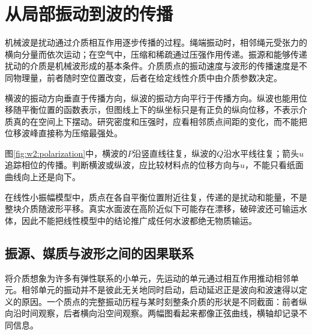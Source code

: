 \section{从局部振动到波的传播}
机械波是扰动通过介质相互作用逐步传播的过程。绳端振动时，相邻绳元受张力的横向分量而依次运动；在空气中，压缩和稀疏通过压强作用传递。振源和能够传递扰动的介质是机械波形成的基本条件。介质质点的振动速度与波形的传播速度是不同物理量，前者随时空位置改变，后者在给定线性介质中由介质参数决定。

横波的振动方向垂直于传播方向，纵波的振动方向平行于传播方向。纵波也能用位移随平衡位置的函数表示，但图线上下的纵坐标只是有正负的纵向位移，不表示介质真的在空间上下摆动。研究密度和压强时，应看相邻质点间距的变化，而不能把位移波峰直接称为压缩最强处。

图\ref{fig:w2:polarization}中，横波的$P$沿竖直线往复，纵波的$Q$沿水平线往复；箭头$u$追踪相位的传播。判断横波或纵波，应比较材料点的位移方向与$u$，不能只看纸面曲线向上还是向下。


在线性小振幅模型中，质点在各自平衡位置附近往复，传递的是扰动和能量，不是整块介质随波形平移。真实水面波在高阶近似下可能存在漂移，破碎波还可输运水体，因此不能把线性模型中的结论推广成任何水波都绝无物质输运。


\subsection{振源、媒质与波形之间的因果联系}
将介质想象为许多有弹性联系的小单元，先运动的单元通过相互作用推动相邻单元。相邻单元的振动并不是彼此无关地同时启动，启动延迟正是波向和波速得以定义的原因。一个质点的完整振动历程与某时刻整条介质的形状是不同截面：前者纵向沿时间观察，后者横向沿空间观察。两幅图看起来都像正弦曲线，横轴却记录不同信息。


